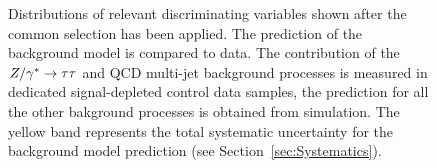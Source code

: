 \begin{figure}[p]
     \begin{center}

    \end{center}
    \caption{Distributions of relevant discriminating variables shown after the common selection has been applied.
	The prediction of the  background model is compared to  data.
	The contribution of the $Z/\gamma^*\rightarrow \tau\tau$ and QCD multi-jet background processes is measured in  dedicated  signal-depleted control data samples,
	the prediction for all the other bakground processes is obtained from simulation.
	The yellow band represents the total systematic uncertainty for the background model prediction (see Section~\ref{sec:Systematics}).}
   \label{fig:selections}
\end{figure}




